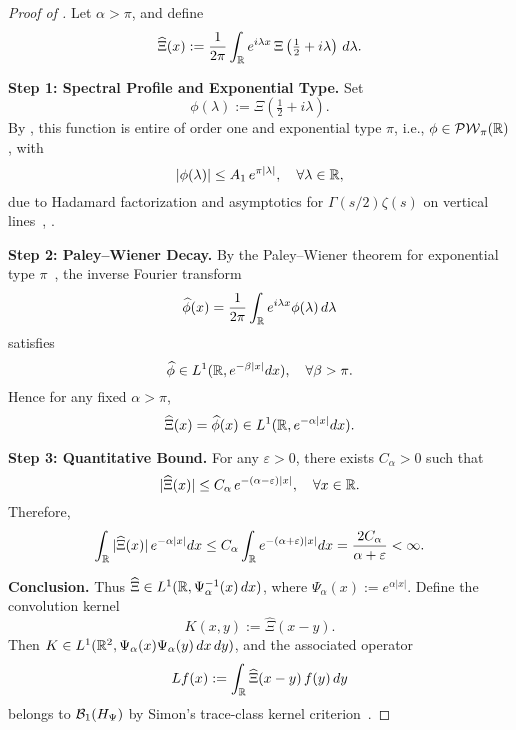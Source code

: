 \begin{proof}[Proof of ]
Let \( \alpha > \pi \), and define
\[
\widehat{\Xi}(x) := \frac{1}{2\pi} \int_{\mathbb{R}} e^{i\lambda x} \, \Xi\left( \tfrac{1}{2} + i\lambda \right)\, d\lambda.
\]

\medskip
\noindent\textbf{Step 1: Spectral Profile and Exponential Type.}
Set
\[
\phi(\lambda) := \Xi\left( \tfrac{1}{2} + i\lambda \right).
\]
By , this function is entire of order one and exponential type \( \pi \), i.e., \( \phi \in \mathcal{PW}_{\pi}(\mathbb{R}) \), with
\[
|\phi(\lambda)| \le A_1\, e^{\pi |\lambda|}, \quad \forall \lambda \in \mathbb{R},
\]
due to Hadamard factorization and asymptotics for \( \Gamma(s/2)\zeta(s) \) on vertical lines~\cite[Ch.~3]{Levin1996EntireLectures}, \cite[Ch.~2]{Titchmarsh1986Zeta}.

\medskip
\noindent\textbf{Step 2: Paley--Wiener Decay.}
By the Paley--Wiener theorem for exponential type \( \pi \)~\cite[Thm.~3.2.4]{Levin1996EntireLectures}, the inverse Fourier transform
\[
\widehat{\phi}(x) = \frac{1}{2\pi} \int_{\mathbb{R}} e^{i\lambda x} \phi(\lambda)\, d\lambda
\]
satisfies
\[
\widehat{\phi} \in L^1(\mathbb{R}, e^{-\beta |x|} dx), \quad \forall \beta > \pi.
\]
Hence for any fixed \( \alpha > \pi \),
\[
\widehat{\Xi}(x) = \widehat{\phi}(x) \in L^1(\mathbb{R}, e^{-\alpha |x|} dx).
\]

\medskip
\noindent\textbf{Step 3: Quantitative Bound.}
For any \( \varepsilon > 0 \), there exists \( C_\alpha > 0 \) such that
\[
|\widehat{\Xi}(x)| \le C_\alpha\, e^{-(\alpha - \varepsilon)|x|}, \quad \forall x \in \mathbb{R}.
\]
Therefore,
\[
\int_{\mathbb{R}} |\widehat{\Xi}(x)|\, e^{-\alpha |x|} dx
\le C_\alpha \int_{\mathbb{R}} e^{-(\alpha + \varepsilon)|x|} dx
= \frac{2 C_\alpha}{\alpha + \varepsilon} < \infty.
\]

\medskip
\noindent\textbf{Conclusion.}
Thus \( \widehat{\Xi} \in L^1(\mathbb{R}, \Psi_\alpha^{-1}(x)\, dx) \), where \( \Psi_\alpha(x) := e^{\alpha |x|} \). Define the convolution kernel
\[
K(x,y) := \widehat{\Xi}(x - y).
\]
Then \( K \in L^1(\mathbb{R}^2, \Psi_\alpha(x)\Psi_\alpha(y)\, dx\,dy) \), and the associated operator
\[
L f(x) := \int_{\mathbb{R}} \widehat{\Xi}(x - y)\, f(y)\, dy
\]
belongs to \( \mathcal{B}_1(H_{\Psi}) \) by Simon’s trace-class kernel criterion~\cite[Thm.~4.2]{Simon2005TraceIdeals}.
\end{proof}

